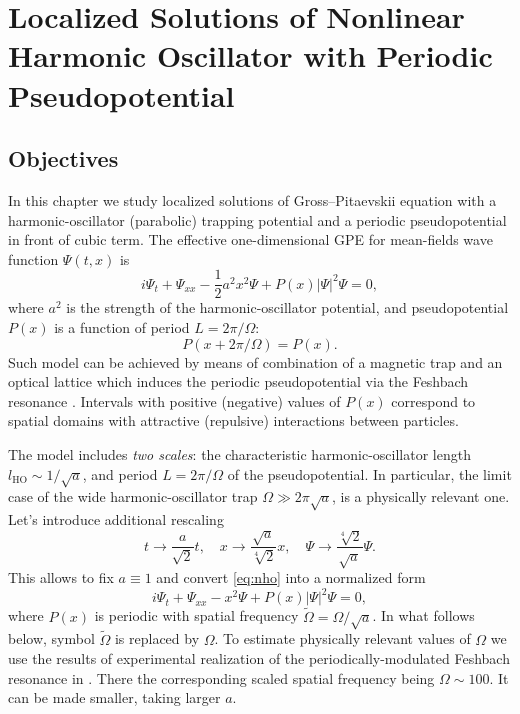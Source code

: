 \chapter{Localized Solutions of Nonlinear Harmonic Oscillator with Periodic Pseudopotential}

\section{Objectives}

In this chapter we study localized solutions of Gross--Pitaevskii equation with a harmonic-oscillator (parabolic) trapping potential and a periodic pseudopotential in front of cubic term.
The effective one-dimensional GPE for mean-fields wave function $\Psi(t, x)$ is
\begin{equation}
	i \Psi_t + \Psi_{xx} - \dfrac{1}{2} a^2 x^2 \Psi + P(x) |\Psi|^2 \Psi = 0,
\label{eq:nho}
\end{equation}
where $a^2$ is the strength of the harmonic-oscillator potential, and pseudopotential $P(x)$ is a function of period $L = 2 \pi / \Omega$:
\begin{equation}
	P(x + 2 \pi / \Omega) = P(x).
\end{equation}
Such model can be achieved by means of combination of a magnetic trap and an optical lattice which induces the periodic pseudopotential via the Feshbach resonance \cite{SakaguchiMalomed2010}.
Intervals with positive (negative) values of $P(x)$ correspond to spatial domains with attractive (repulsive) interactions between particles.

The model includes {\it two scales}: the characteristic harmonic-oscillator length $l_{\mathrm{HO}} \sim 1 / \sqrt{a}$, and period $L = 2 \pi / \Omega$ of the pseudopotential.
In particular, the limit case of the wide harmonic-oscillator trap $\Omega \gg 2 \pi \sqrt{a}$, is a physically relevant one.
Let's introduce additional rescaling
\begin{equation}
	t \to \dfrac{a}{\sqrt{2}} t, \quad x \to \dfrac{\sqrt{a}}{\sqrt[4]{2}} x, \quad \Psi \to \dfrac{\sqrt[4]{2}}{\sqrt{a}} \Psi.
\end{equation}
This allows to fix $a \equiv 1$ and convert \eqref{eq:nho} into a normalized form
\begin{equation}
	i \Psi_t + \Psi_{xx} - x^2 \Psi + P(x) |\Psi|^2 \Psi = 0,
\label{eq:nho-scaled}
\end{equation}
where $P(x)$ is periodic with spatial frequency $\widetilde{\Omega} = \Omega / \sqrt{a}$.
In what follows below, symbol $\widetilde{\Omega}$ is replaced by $\Omega$.
To estimate physically relevant values of $\Omega$ we use the results of experimental realization of the periodically-modulated Feshbach resonance in \cite{YamazakiTaieSugawaTakahashi}.
There the corresponding scaled spatial frequency being $\Omega \sim 100$.
It can be made smaller, taking larger $a$.

